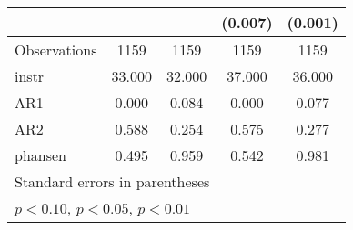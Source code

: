 \begin{table}[htbp]
\begin{tabular}{l*{4}{c}}
                &                  &                  &  (0.007)         &  (0.001)         \\
\hline
Observations    &     1159         &     1159         &     1159         &     1159         \\
instr           &   33.000         &   32.000         &   37.000         &   36.000         \\
AR1             &    0.000         &    0.084         &    0.000         &    0.077         \\
AR2             &    0.588         &    0.254         &    0.575         &    0.277         \\
phansen         &    0.495         &    0.959         &    0.542         &    0.981         \\
\hline\hline
\multicolumn{5}{l}{\footnotesize Standard errors in parentheses}\\
\multicolumn{5}{l}{\footnotesize \sym{*} \(p<0.10\), \sym{**} \(p<0.05\), \sym{***} \(p<0.01\)}\\
\end{tabular}
\end{table}
